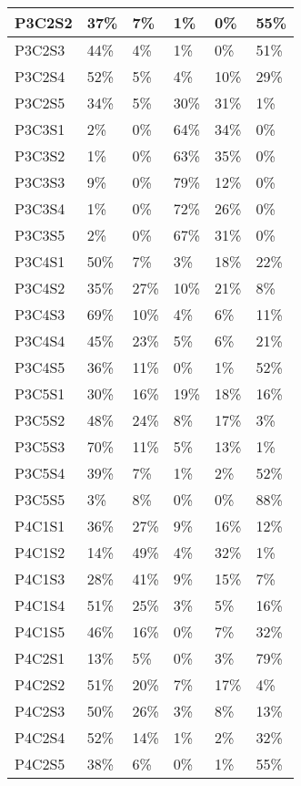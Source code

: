 \begin{longtable}{|l|l|l|l|l|l|}
P3C2S2 & 37\% & 7\% & 1\% & 0\% & 55\% \\ \hline
P3C2S3 & 44\% & 4\% & 1\% & 0\% & 51\% \\ \hline
P3C2S4 & 52\% & 5\% & 4\% & 10\% & 29\% \\ \hline
P3C2S5 & 34\% & 5\% & 30\% & 31\% & 1\% \\ \hline
P3C3S1 & 2\% & 0\% & 64\% & 34\% & 0\% \\ \hline
P3C3S2 & 1\% & 0\% & 63\% & 35\% & 0\% \\ \hline
P3C3S3 & 9\% & 0\% & 79\% & 12\% & 0\% \\ \hline
P3C3S4 & 1\% & 0\% & 72\% & 26\% & 0\% \\ \hline
P3C3S5 & 2\% & 0\% & 67\% & 31\% & 0\% \\ \hline
P3C4S1 & 50\% & 7\% & 3\% & 18\% & 22\% \\ \hline
P3C4S2 & 35\% & 27\% & 10\% & 21\% & 8\% \\ \hline
P3C4S3 & 69\% & 10\% & 4\% & 6\% & 11\% \\ \hline
P3C4S4 & 45\% & 23\% & 5\% & 6\% & 21\% \\ \hline
P3C4S5 & 36\% & 11\% & 0\% & 1\% & 52\% \\ \hline
P3C5S1 & 30\% & 16\% & 19\% & 18\% & 16\% \\ \hline
P3C5S2 & 48\% & 24\% & 8\% & 17\% & 3\% \\ \hline
P3C5S3 & 70\% & 11\% & 5\% & 13\% & 1\% \\ \hline
P3C5S4 & 39\% & 7\% & 1\% & 2\% & 52\% \\ \hline
P3C5S5 & 3\% & 8\% & 0\% & 0\% & 88\% \\ \hline
P4C1S1 & 36\% & 27\% & 9\% & 16\% & 12\% \\ \hline
P4C1S2 & 14\% & 49\% & 4\% & 32\% & 1\% \\ \hline
P4C1S3 & 28\% & 41\% & 9\% & 15\% & 7\% \\ \hline
P4C1S4 & 51\% & 25\% & 3\% & 5\% & 16\% \\ \hline
P4C1S5 & 46\% & 16\% & 0\% & 7\% & 32\% \\ \hline
P4C2S1 & 13\% & 5\% & 0\% & 3\% & 79\% \\ \hline
P4C2S2 & 51\% & 20\% & 7\% & 17\% & 4\% \\ \hline
P4C2S3 & 50\% & 26\% & 3\% & 8\% & 13\% \\ \hline
P4C2S4 & 52\% & 14\% & 1\% & 2\% & 32\% \\ \hline
P4C2S5 & 38\% & 6\% & 0\% & 1\% & 55\% \\ \hline

\end{longtable}
